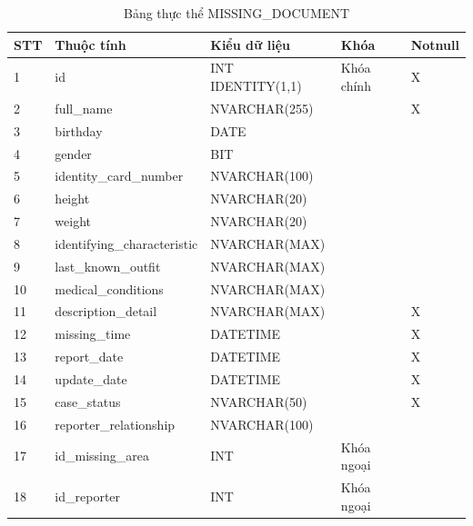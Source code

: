 \documentclass[../DoAn.tex]{subfiles}
\begin{document}
\begin{table}[H]
	\centering{}
	\begin{tabular}{m{1cm} m{4cm} m{3.5cm} m{3cm} m{1.5cm}}
		\hline
		\textbf{STT} & \textbf{Thuộc tính}         & \textbf{Kiểu dữ liệu} & \textbf{Khóa} & \textbf{Notnull}
		\\ \hline
		1            & id                          & INT IDENTITY(1,1)     & Khóa chính    & X
		\\ \hline
		2            & full\_name                  & NVARCHAR(255)         &               & X
		\\ \hline
		3            & birthday                    & DATE                  &               &
		\\ \hline
		4            & gender                      & BIT                   &               &
		\\ \hline
		5            & identity\_card\_number      & NVARCHAR(100)         &               &
		\\ \hline
		6            & height                      & NVARCHAR(20)          &               &
		\\ \hline
		7            & weight                      & NVARCHAR(20)          &               &
		\\ \hline
		8            & identifying\_characteristic & NVARCHAR(MAX)         &               &
		\\ \hline
		9            & last\_known\_outfit         & NVARCHAR(MAX)         &               &
		\\ \hline
		10           & medical\_conditions         & NVARCHAR(MAX)         &               &
		\\ \hline
		11           & description\_detail         & NVARCHAR(MAX)         &               & X
		\\ \hline
		12           & missing\_time               & DATETIME              &               & X
		\\ \hline
		13           & report\_date                & DATETIME              &               & X
		\\ \hline
		14           & update\_date                & DATETIME              &               & X
		\\ \hline
		15           & case\_status                & NVARCHAR(50)          &               & X
		\\ \hline
		16           & reporter\_relationship      & NVARCHAR(100)         &               &
		\\ \hline
		17           & id\_missing\_area           & INT                   & Khóa ngoại    &
		\\ \hline
		18           & id\_reporter                & INT                   & Khóa ngoại    &
		\\ \hline
	\end{tabular}
	\caption{Bảng thực thể MISSING\_DOCUMENT}
\end{table}
\end{document}
